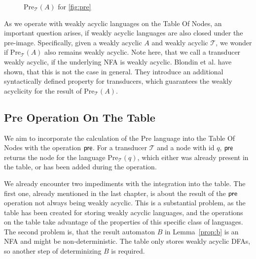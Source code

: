 \begin{figure}[htb]
    	\caption{$\text{Pre}_{\mathcal{T}}(A)$ for \autoref{fig:pre}}\label{fig:pre-result}
\end{figure}

As we operate with weakly acyclic languages on the Table Of Nodes, an important question arises, if weakly acyclic languages are also closed under the pre-image. Specifically, given a weakly acyclic $A$ and weakly acyclic $\mathcal{T}$, we wonder if $\text{Pre}_{\mathcal{T}}(A)$ also remains weakly acyclic. Note here, that we call a transducer weakly acyclic, if the underlying NFA is weakly acyclic. Blondin et al. have shown, that this is not the case in general. They introduce an additional syntactically defined property for transducers, which guarantees the weakly acyclicity for the result of $\text{Pre}_{\mathcal{T}}(A)$\cite{blondin_24}.

\subsection{Pre Operation On The Table}
We aim to incorporate the calculation of the Pre language into the Table Of Nodes with the operation $\operatorname{\textsf{pre}}$. For a transducer $\mathcal{T}$ and a node with id $q$, $\operatorname{\textsf{pre}}$ returns the node for the language $\text{Pre}_{\mathcal{T}}(q)$, which either was already present in the table, or has been added during the operation.

\par

We already encounter two impediments with the integration into the table. The first one, already mentioned in the last chapter, is about the result of the $\operatorname{\textsf{pre}}$ operation not always being weakly acyclic. This is a substantial problem, as the table has been created for storing weakly acyclic languages, and the operations on the table take advantage of the properties of this specific class of languages.
The second problem is, that the result automaton $B$ in Lemma~\ref{prop:b} is an NFA and might be non-deterministic. The table only stores weakly acyclic DFAs, so another step of determinizing $B$ is required.


